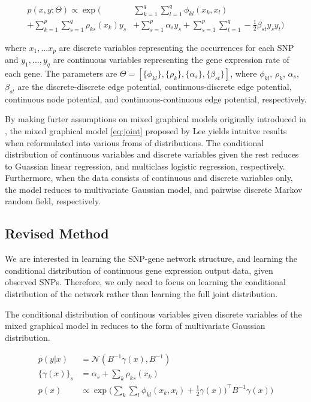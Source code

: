 \documentclass{article}
\begin{document}
\begin{align}
p(x, y ; \Theta) \propto \exp \Big( &\sum_{k=1}^{q} \sum_{l=1}^{q} \phi_{kl} (x_k, x_l) \nonumber \\
+ \sum_{k=1}^{p} \sum_{s=1}^{q} \rho_{ks}(x_k) y_s  &+ \sum_{s=1}^{p} \alpha_s y_s + \sum_{s=1}^{p} \sum_{t=1}^{q} -\frac{1}{2} \beta_{st} y_s y_t \Big) \label{eq:joint}
\end{align} 

where $x_1, ... x_p$ are discrete variables representing the occurrences for each SNP and $y_1, ..., y_q$ are continuous variables representing the gene expression rate of each gene. 
The parameters are $\Theta = [\{\phi_{kl}\}, \{\rho_{k}\}, \{\alpha_{s}\}, \{\beta_{st}\}]$, where $\phi_{kl}$, $\rho_{k}$, $\alpha_{s}$, $\beta_{st}$ are the discrete-discrete edge potential, continuous-discrete edge potential, continuous node potential, and continuous-continuous edge potential, respectively.

By making furter assumptions on mixed graphical models originally introduced in \cite{lauritzen1989graphical}, the mixed graphical model \ref{eq:joint} proposed by Lee yields intuitve results when reformulated into various froms of distributions. The conditional distribution of continuous variables and discrete variables given the rest reduces to Guassian linear regression, and multiclass logistic regression, respectively. Furthermore, when the data consists of continuous and discrete variables only, the model reduces to multivariate Gaussian model, and pairwise discrete Markov random field, respectively. 

\subsection{Revised Method}
We are interested in learning the SNP-gene network structure, and learning the conditional distribution of continuous gene expression output data, given observed SNPs.
Therefore, we only need to focus on learning the conditional distribution of the network rather than learning the full joint distribution. 

The conditional distribution of continous variables given discrete variables of the mixed graphical model in \cite{lee2013structure} reduces to the form of multivariate Gaussian distribution.

\begin{align}
p(y|x) &= \mathcal{N}(B^{-1}\gamma(x), B^{-1}) \label{eq:cond_prob}\\
\{\gamma(x)\}_s &= \alpha_s + \sum_{k} \rho_{ks}(x_k) \\
p(x) &\propto \exp \Big( \sum_{k} \sum_{l} \phi_{kl}(x_k, x_l) + \frac{1}{2} \gamma(x))^\intercal B^{-1} \gamma(x) \Big)
\end{align}
\end{document}
